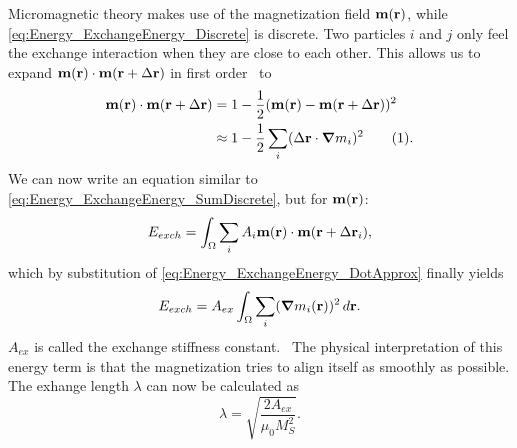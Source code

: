 \documentclass[10pt,a4paper]{article}
\newcommand{\numberthis}{\addtocounter{equation}{1}\tag{\theequation}}
\begin{document}
Micromagnetic theory makes use of the magnetization field $\vb{m}(\vb{r})$, while \cref{eq:Energy_ExchangeEnergy_Discrete} is discrete. Two particles $i$ and $j$ only feel the exchange interaction when they are close to each other. This allows us to expand $\vb{m}(\vb{r}) \cdot \vb{m}(\vb{r} + \Delta\vb{r})$ in first order~\cite{abert2013discrete} to
\begin{align*}
    \vb{m}(\vb{r}) \cdot \vb{m}(\vb{r} + \Delta\vb{r}) &= 1 - \frac{1}{2}(\vb{m}(\vb{r}) - \vb{m}(\vb{r} + \Delta\vb{r}))^2 \\
    &\approx 1 - \frac{1}{2}\sum_i(\Delta\vb{r} \cdot \gradient{m_i})^2 \numberthis \label{eq:Energy_ExchangeEnergy_DotApprox} \mathrm{.}
\end{align*}
We can now write an equation similar to \cref{eq:Energy_ExchangeEnergy_SumDiscrete}, but for $\vb{m}(\vb{r})$:
\begin{equation*}
    E_{exch} = \int_\Omega \sum_i A_i \vb{m}(\vb{r}) \cdot \vb{m}(\vb{r} + \Delta\vb{r}_i) \mathrm{,}
\end{equation*}
which by substitution of \cref{eq:Energy_ExchangeEnergy_DotApprox} finally yields~\cite{abert2013discrete,Gilbert1956}
\begin{equation}
    E_{exch} = A_{ex} \int_\Omega \sum_i (\gradient{m_i}(\vb{r}))^2 \, d\vb{r} \mathrm{.} \label{eq:Energy_Term_Exchange}
\end{equation}
$A_{ex}$ is called the exchange stiffness constant.~\cite{Gilbert1956} The physical interpretation of this energy term is that the magnetization tries to align itself as smoothly as possible.
The exhange length $\lambda$ can now be calculated as
\begin{equation}
    \lambda = \sqrt{\frac{2 A_{ex}}{\mu_0 M_S^2}} \mathrm{.}
    \label{eq:Energy_ExchangeEnergy_ExchangeLength}
\end{equation} %
\end{document}
